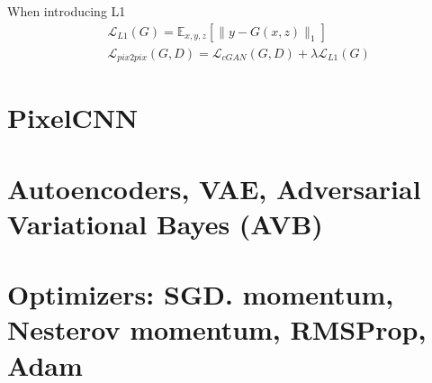 \documentclass[../main.tex]{subfiles}
\begin{document}
When introducing L1
\begin{align}
    &\mathcal{L}_{L1}(G) = \mathbb{E}_{x,y,z}[\|y - G(x, z)\|_1] \\
    &\mathcal{L}_{pix2pix}(G, D) = \mathcal{L}_{cGAN}(G, D) + \lambda \mathcal{L}_{L1}(G)
\end{align}


\section{PixelCNN}
\section{Autoencoders, VAE, Adversarial Variational Bayes (AVB)}
\section{Optimizers: SGD. momentum, Nesterov momentum, RMSProp, Adam}
\end{document}
